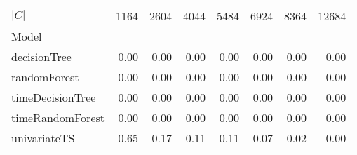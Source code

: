 \begin{tabular}{lrrrrrrr}
\toprule
$|C|$ & 1164 & 2604 & 4044 & 5484 & 6924 & 8364 & 12684 \\
Model &  &  &  &  &  &  &  \\
\midrule
decisionTree & 0.00 & 0.00 & 0.00 & 0.00 & 0.00 & 0.00 & 0.00 \\
randomForest & 0.00 & 0.00 & 0.00 & 0.00 & 0.00 & 0.00 & 0.00 \\
timeDecisionTree & 0.00 & 0.00 & 0.00 & 0.00 & 0.00 & 0.00 & 0.00 \\
timeRandomForest & 0.00 & 0.00 & 0.00 & 0.00 & 0.00 & 0.00 & 0.00 \\
univariateTS & 0.65 & 0.17 & 0.11 & 0.11 & 0.07 & 0.02 & 0.00 \\
\bottomrule
\end{tabular}
